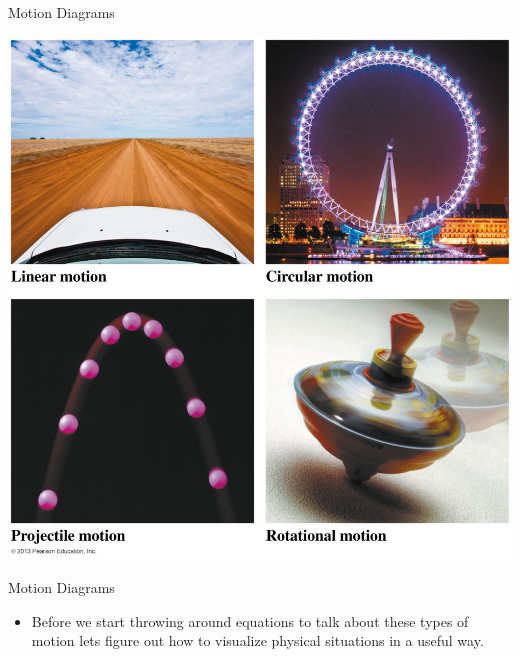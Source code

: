\documentclass{beamer}
\begin{document}
\begin{frame}{Motion Diagrams}
\begin{center}
   \includegraphics[height=0.9\textheight]{../figures/01_01_Figure.jpg}
\end{center}
\end{frame}

\begin{frame}{Motion Diagrams}
\begin{itemize}
   \item Before we start throwing around equations to talk about these types of motion lets figure out how to visualize physical situations in a useful way.
\end{itemize}
\end{frame}
\end{document}
